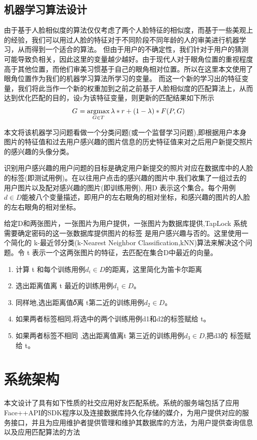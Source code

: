 \subsection{机器学习算法设计}
由于基于人脸相似度的算法仅仅考虑了两个人脸特征的相似度，而基于一些美观上的经验，我们可以用过人脸的特征对于不同阶段不同年龄的人的审美进行机器学习，从而得到一个适合的算法。
但由于用户的不确定性，我们针对于用户的猜测可能导致负相关，因此这里的变量越少越好。由于现代人对于眼角位置的重视程度高于其他位置，而他们审美习惯基于自己的眼角相对位置。所以在这里本文使用了眼角位置作为我们的机器学习算法所学习的变量。
而这一个新的学习出的特征变量，我们将此当作一个新的权重加到之前之前基于人脸相似度的匹配算法上，从而达到优化匹配的目的，设r为该特征变量，则更新的匹配结果如下所示
\begin{equation*}
G^{\*} = \mathop{\argmax_{G \in T}}{\lambda * r+(1-\lambda)* F(P,G)}
\end{equation*}

本文将该机器学习问题看做一个分类问题(或一个监督学习问题),即根据用户本身图片的特征值和过去用户感兴趣的图片信息的历史特征值来对之后用户新提交照片的感兴趣的头像分类。

识别用户感兴趣的用户问题的目标是确定用户新提交的照片对应在数据库中的人脸的标签(即测试用例)。在以往用户点击的感兴趣的图片中,我们收集了一组过去的用户图片以及配对感兴趣的图片(即训练用例), 用D 表示这个集合。每个用例$d \in D$能被八个变量描述，即用户的左右眼角的相对坐标，和感兴趣的图片的人脸的左右眼角的相对坐标。

给定D和两张图片，一张图片为用户提供，一张图片为数据库提供,TapLock 系统需要确定密码的这一张数据库提供图片的标签 是用户感兴趣与否的。这里使用一个简化的 k-最近邻分类(k-Nearest Neighbor Classification,kNN)算法来解决这个问题。令 t 表示一个这两张图片的特征，去匹配在集合D中最近的向量。
\begin{enumerate}
\item 计算 t 和每个训练用例$d_{i} \in D$的距离，这里简化为笛卡尔距离
\item 选出距离值离 t 最近的训练用例$d_{1} \in D$。
\item 同样地,选出距离值𝛿离 t第二近的训练用例$d_{2} \in D$。
\item 如果两者标签相同,将选中的两个训练用例d1和d2的标签赋给 t。
\item 如果两者标签不相同 ,选出距离值离t 
第三近的训练用例$d_{3} \in D$,把d3的
标签赋给 t。
\end{enumerate}

\section{系统架构}
本文设计了具有如下性质的社交应用好友匹配系统。系统的服务端包括了应用Face++API的SDK程序以及连接数据库持久化存储的媒介，为用户提供对应的服务接口，并且为应用维护者提供管理和维护其数据库的方法，为用户提供查询信息以及应用匹配算法的方法
